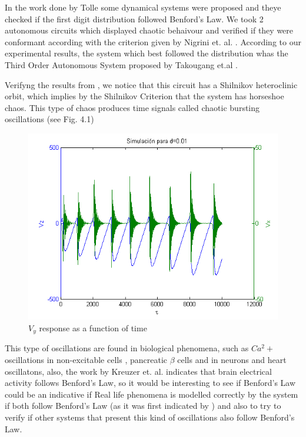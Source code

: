 In the work done by Tolle \cite{Tolle00} some dynamical systems were proposed and theye checked if the first digit distribution followed Benford's Law. We took 2 autonomous circuits which displayed chaotic behaivour and verified if they were conformant according with the criterion given by Nigrini et. al. \cite{Nigrini97}. According to our experimental results, the system which best followed the distribution whas the Third Order Autonomous System proposed by Takougang et.al \cite{Takougang13}.

Verifyng the results from \cite{Takougang13}, we notice that this circuit has a Shilnikov heteroclinic orbit, which implies by the Shilnikov Criterion that the system has horseshoe chaos. This type of chaos produces time signals called chaotic bursting oscillations (see Fig. 4.1)
\begin{figure}[h]
            \centering
            \includegraphics[scale=0.6]{imagenes/2-benford/bursting_oscilatons.png}
            \caption{$V_y$ response as a function of time}
            \end{figure}


This type of oscillations are found in biological phenomena, such as $Ca^2+$ oscillations in non-excitable cells \cite{Perc03}, pancreatic $\beta$ cells \cite{Sherman88} and in neurons\cite{Ermentrout09} and heart oscillatons, also, the work by Kreuzer et. al. \cite{Kreuzer14} indicates that brain electrical activity follows Benford's Law, so it would be interesting to see if Benford's Law could be an indicative if Real life phenomena is modelled correctly by the system if both follow Benford's Law (as it was first indicated by \cite{Tolle00}) and also to try to verify if other systems that present this kind of oscillations also follow Benford's Law.
